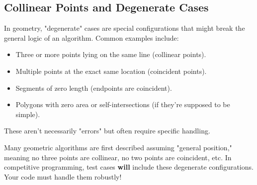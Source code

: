 \subsection{Collinear Points and Degenerate Cases}
\label{ssec:A.3.4}

\begin{intuition}
\label{intuition:A.3.4.degenerate_common}
In geometry, "degenerate" cases are special configurations that might break the general logic of an algorithm. Common examples include:
\begin{itemize}
    \item Three or more points lying on the same line (collinear points).
    \item Multiple points at the exact same location (coincident points).
    \item Segments of zero length (endpoints are coincident).
    \item Polygons with zero area or self-intersections (if they're supposed to be simple).
\end{itemize}
These aren't necessarily "errors" but often require specific handling.
\end{intuition}

\begin{warning}
\label{warn:A.3.4.general_position}
Many geometric algorithms are first described assuming "general position," meaning no three points are collinear, no two points are coincident, etc. In competitive programming, test cases \textbf{will} include these degenerate configurations. Your code must handle them robustly!
\end{warning}

